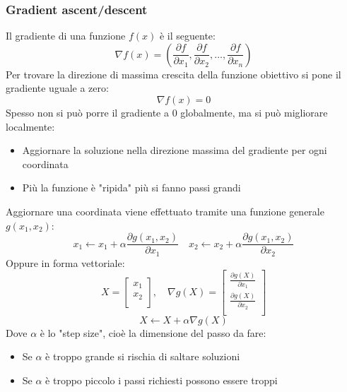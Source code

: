 \documentclass[a4paper]{article}
\begin{document}
\subsubsection{Gradient ascent/descent}
Il gradiente di una funzione \( f(x) \) è il seguente:
\[
  \nabla f(x) = \left( \frac{\partial f}{\partial x_1}, \frac{\partial f}{\partial x_2},
  \ldots, \frac{\partial f}{\partial x_n} \right)
\] 
Per trovare la direzione di massima crescita della funzione obiettivo si pone
il gradiente uguale a zero:
\[
  \nabla f(x) = 0
\] 
Spesso non si può porre il gradiente a 0 globalmente, ma si può migliorare localmente:
\begin{itemize}
  \item Aggiornare la soluzione nella direzione massima del gradiente per ogni coordinata
  \item Più la funzione è "ripida" più si fanno passi grandi
\end{itemize}
Aggiornare una coordinata viene effettuato tramite una funzione generale \( g(x_1, x_2) \):
\[
  x_1 \leftarrow x_1 + \alpha \frac{\partial g(x_1, x_2)}{\partial x_1}
  \quad
  x_2 \leftarrow x_2 + \alpha \frac{\partial g(x_1, x_2)}{\partial x_2}
\] 
Oppure in forma vettoriale:
\[
  X = \begin{bmatrix}
    x_1 \\
    x_2 \\
  \end{bmatrix}
  ,\quad
  \nabla g(X) = \begin{bmatrix}
    \frac{\partial g(X)}{\partial x_1} \\
    \frac{\partial g(X)}{\partial x_2} \\
  \end{bmatrix}
\] 
\[
  X \leftarrow X + \alpha \nabla g(X)
\] 
Dove \( \alpha \) è lo "step size", cioè la dimensione del passo da fare:
\begin{itemize}
  \item Se \( \alpha \) è troppo grande si rischia di saltare soluzioni
  \item Se \( \alpha \) è troppo piccolo i passi richiesti possono essere troppi
\end{itemize}
\end{document}
